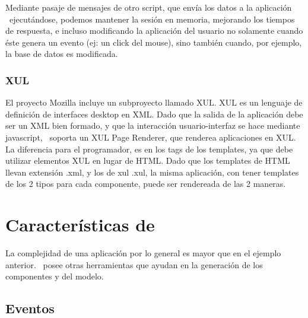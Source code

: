 Mediante pasaje de mensajes de otro script, que envía los datos a la aplicación \PWB \ ejecutándose, podemos mantener la sesión en memoria, mejorando los tiempos de respuesta, e incluso modificando la aplicación del usuario no solamente cuando éste genera un evento (ej: un click del mouse), sino también cuando, por ejemplo, la base de datos es modificada.

\subsubsection{XUL}

El proyecto Mozilla incluye un subproyecto llamado XUL\cite{XUL}. XUL es un lenguaje de definición de interfaces desktop en XML. Dado que la salida de la aplicación debe ser un XML bien formado, y que la interacción usuario-interfaz se hace mediante javascript, \PWB \ soporta un XUL Page Renderer, que renderea aplicaciones en XUL. La diferencia para el programador, es en los tags de los templates, ya que debe utilizar elementos XUL en lugar de HTML. Dado que los templates de HTML llevan extensión .xml, y los de xul .xul, la misma aplicación, con tener templates de los 2 tipos para cada componente, puede ser rendereada de las 2 maneras.

\section{Características de \PITS}

La complejidad de una aplicación por lo general es mayor que en el ejemplo anterior. \PWB\ posee otras herramientas que ayudan en la generación de los componentes y del modelo.




\subsection{Eventos}
\label{sub-events}

